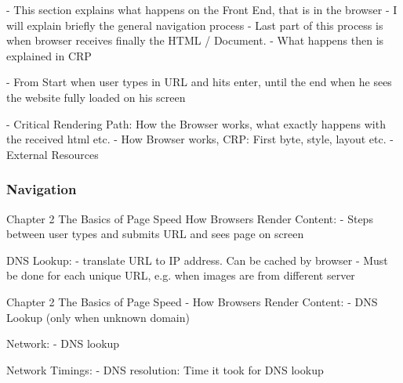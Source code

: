 - This section explains what happens on the Front End, that is in the browser
- I will explain briefly the general navigation process
- Last part of this process is when browser receives finally the HTML / Document. 
- What happens then is explained in CRP

- From Start when user types in URL and hits enter, until the end when he sees the website fully loaded on his screen


- Critical Rendering Path: How the Browser works, what exactly happens with the received html etc.
- How Browser works, CRP: First byte, style, layout etc.
- External Resources





\subsubsection{Navigation}



Chapter 2 The Basics of Page Speed
How Browsers Render Content:
- Steps between user types and submits URL and sees page on screen




DNS Lookup:
- translate URL to IP address. Can be cached by browser
- Must be done for each unique URL, e.g. when images are from different server


Chapter 2 The Basics of Page Speed - How Browsers Render Content:
- DNS Lookup (only when unknown domain)

Network:
- DNS lookup


Network Timings:
- DNS resolution: Time it took for DNS lookup




